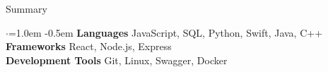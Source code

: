 \documentclass{resume} %
\begin{document}
\vspace{-0.5em}
\begin{rSection}{Summary}
  \vspace{0.5em}
  \begin{list}{$\cdot$}{\leftmargin=1.0em}
    \itemsep -0.5em \vspace{-0.5em}
      {\bf Languages} \hspace{73pt} JavaScript, SQL, Python, Swift, Java, C++ \\
      {\bf Frameworks} \hspace{63pt} React, Node.js, Express\\
      {\bf Development Tools} \hspace{21pt} Git, Linux, Swagger, Docker \\
  \end{list}
  \vspace{-1em}
\end{rSection}

\end{document}
